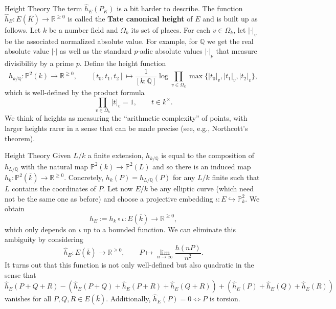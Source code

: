 \documentclass[aspectratio=1610]{beamer}
\renewcommand{\P}{\mathbb{P}}
\newcommand{\Q}{\mathbb{Q}}
\newcommand{\R}{\mathbb{R}}
\newcommand{\abs}[1]{\left\vert#1\right\vert}
\newcommand{\df}{\dfrac}
\newcommand{\inj}{\hookrightarrow}
\newcommand{\ov}{\overline}
\begin{document}
\begin{frame}{Height Theory}
The term $\hat{h}_E(P_K)$ is a bit harder to describe. The function $\hat{h}_E: E(\ov{K})\to\R^{\geq0}$ is called the \textbf{Tate canonical height} of $E$ and is built up as follows. Let $k$ be a number field and $\Omega_k$ its set of places. For each $v\in\Omega_k$, let $\abs{\cdot}_v$ be the associated normalized absolute value. For example, for $\Q$ we get the real absolute value $\abs{\cdot}$ as well as the standard $p$-adic absolute values $\abs{\cdot}_p$ that measure divisibility by a prime $p$. Define the height function
$$h_{k/\Q}: \P^2(k)\to\R^{\geq0},\qquad[t_0,t_1,t_2]\mapsto\df{1}{[k:\Q]}\log\prod_{v\in\Omega_k}\max\{|t_0|_v,|t_1|_v,|t_2|_v\},$$
which is well-defined by the product formula 
$$\prod_{v\in\Omega_k}|t|_v=1,\qquad t\in k^{\times}.$$ 
We think of heights as measuring the ``arithmetic complexity'' of points, with larger heights rarer in a sense that can be made precise (see, e.g., Northcott's theorem). 
\end{frame}

\begin{frame}{Height Theory}
Given $L/k$ a finite extension, $h_{k/\Q}$ is equal to the composition of $h_{L/\Q}$ with the natural map $\P^2(k)\to\P^2(L)$ and so there is an induced map $h_k: \P^2(\ov{k})\to\R^{\geq0}$. Concretely, $h_k(P)=h_{L/\Q}(P)$ for any $L/k$ finite such that $L$ contains the coordinates of $P$. Let now $E/k$ be any elliptic curve (which need not be the same one as before) and choose a projective embedding $\iota: E\inj\P_k^2$. We obtain 
$$h_E:=h_k\circ\iota: E(\ov{k})\to\R^{\geq0},$$
which only depends on $\iota$ up to a bounded function. We can eliminate this ambiguity by considering 
$$\hat{h}_E: E(\ov{k})\to\R^{\geq0},\qquad P\mapsto\lim_{n\to\infty}\df{h(nP)}{n^2}.$$
It turns out that this function is not only well-defined but also quadratic in the sense that 
$$\hat{h}_E(P+Q+R)-(\hat{h}_E(P+Q)+\hat{h}_E(P+R)+\hat{h}_E(Q+R))+(\hat{h}_E(P)+\hat{h}_E(Q)+\hat{h}_E(R))$$
vanishes for all $P,Q,R\in E(\ov{k})$. Additionally, $\hat{h}_E(P)=0\iff P$ is torsion.
\end{frame}
\end{document}

